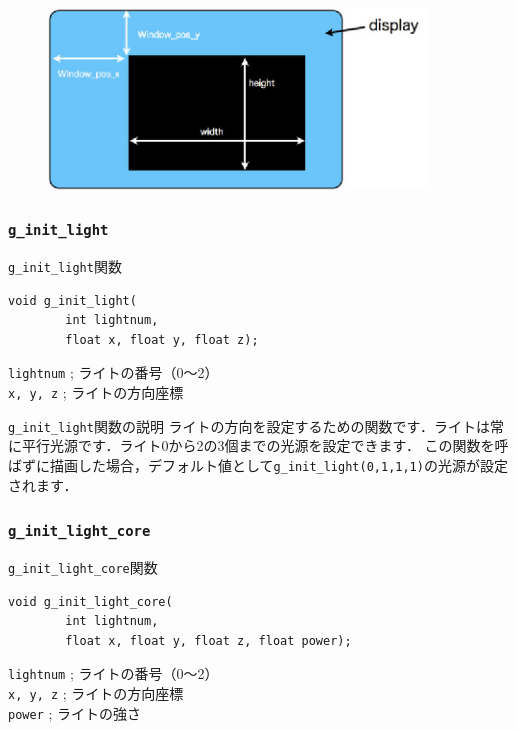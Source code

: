 \documentclass[platex,a4paper,12pt]{jsarticle}%
\begin{document}
\begin{figure}[htb]
	\includegraphics[width=100mm]{./Figures/eps/Canvas_g_init_core.eps}
\end{figure}


\clearpage
\subsubsection{\texttt{g\_init\_light}}

\begin{itembox}[l]{\texttt{g\_init\_light}関数}
\begin{verbatim}
void g_init_light(
        int lightnum,
        float x, float y, float z);
\end{verbatim}
\verb|lightnum| ; ライトの番号（0〜2）\\
\verb|x, y, z| ; ライトの方向座標
\end{itembox}

\begin{itembox}[l]{\texttt{g\_init\_light}関数の説明}
ライトの方向を設定するための関数です．ライトは常に平行光源です．ライト0から2の3個までの光源を設定できます．
この関数を呼ばずに描画した場合，デフォルト値として\texttt{g\_init\_light(0,1,1,1)}の光源が設定されます．
\end{itembox}

\subsubsection{\texttt{g\_init\_light\_core}}

\begin{itembox}[l]{\texttt{g\_init\_light\_core}関数}
\begin{verbatim}
void g_init_light_core(
        int lightnum,
        float x, float y, float z, float power);
\end{verbatim}
\verb|lightnum| ; ライトの番号（0〜2）\\
\verb|x, y, z| ; ライトの方向座標\\
\verb|power| ; ライトの強さ
\end{itembox}
\end{document}
